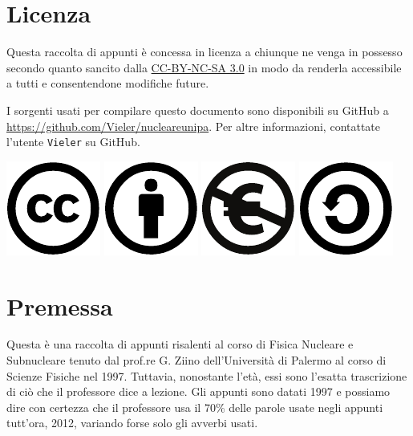 \chapter{Licenza}
Questa raccolta di appunti è concessa in licenza a chiunque ne venga in possesso
secondo quanto sancito dalla \href{http://creativecommons.org/licenses/by-nc-sa/3.0/it/}{CC-BY-NC-SA 3.0}
in modo da renderla accessibile a tutti e consentendone modifiche future.

I sorgenti usati per compilare questo documento sono disponibili su GitHub a
\url{https://github.com/Vieler/nucleareunipa}. Per altre informazioni,
contattate l'utente \verb!Vieler! su GitHub.
\begin{flushright}
\includegraphics[scale=1]{img/cc}
\includegraphics[scale=1]{img/by}
\includegraphics[scale=1]{img/nc-eu}
\includegraphics[scale=1]{img/sa}
\end{flushright}
\chapter{Premessa}
\vfill
Questa è una raccolta di appunti risalenti al corso di Fisica Nucleare e
Subnucleare tenuto dal prof.re G. Ziino dell'Università di Palermo al corso di
Scienze Fisiche nel 1997. Tuttavia, nonostante l'età, essi sono l'esatta
trascrizione di ciò che il professore dice a lezione. Gli appunti sono datati
1997 e possiamo dire con certezza che il professore usa il 70\% delle parole
usate negli appunti tutt'ora, 2012, variando forse solo gli avverbi usati.

